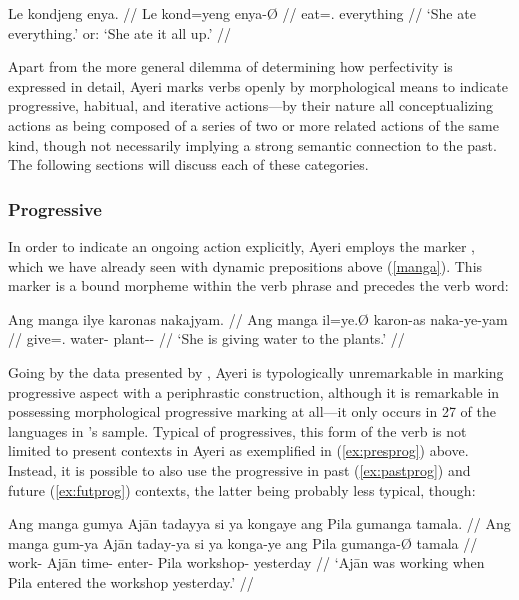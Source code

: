 \ex\begingl
	\gla Le kondjeng enya. //
	\glb Le kond=yeng enya-Ø //
	\glc \PatTI{} eat=\TsgF{}.\Aarg{} everything //
	\glft `She ate everything.' or: `She ate it all up.' //
\endgl\xe

Apart from the more general dilemma of determining how perfectivity is expressed 
in detail, Ayeri marks verbs openly by morphological means to indicate 
progressive, habitual, and iterative actions---by their nature all 
conceptualizing actions as being composed of a series of two or more related 
actions of the same kind, though not necessarily implying a strong semantic 
connection to the past. The following sections will discuss each of these 
categories.

\subsubsection{Progressive}

In order to indicate an ongoing action explicitly, Ayeri employs the marker 
, which we have already seen with dynamic prepositions above 
(\autoref{manga}). This marker is a bound morpheme within the verb phrase and 
precedes the verb word:

\ex\label{ex:presprog}\begingl
	\gla Ang manga ilye karonas nakajyam. //
	\glb Ang manga il=ye.Ø karon-as naka-ye-yam //
	\glc \AgtT{} \Prog{} give=\TsgF{}.\Top{} water-\Parg{} 
		plant-\Pl{}-\Dat{} //
	\glft `She is giving water to the plants.' //
\endgl\xe

Going by the data presented by \citet[91]{dahl1985}, Ayeri is typologically 
unremarkable in marking progressive aspect with a periphrastic construction, 
although it is remarkable in possessing morphological progressive marking at 
all---it only occurs in 27\pct{} of the languages in \citeauthor{dahl1985}'s 
sample. Typical of progressives, this form of the verb is not limited to 
present contexts in Ayeri as exemplified in (\ref{ex:presprog}) above. Instead, 
it is possible to also use the progressive in past (\ref{ex:pastprog}) and 
future (\ref{ex:futprog}) contexts, the latter being probably less typical, 
though:

\pex\label{ex:nonpresprog}
\a\label{ex:pastprog}\begingl
	\gla Ang manga gumya {} Ajān tadayya si ya kongaye ang Pila gumanga 
		tamala. //
	\glb Ang manga gum-ya {} Ajān taday-ya si ya konga-ye ang Pila 
		gumanga-Ø tamala //
	\glc \AgtT{} \Prog{} work-\Tsg{} \Top{} Ajān time-\Loc{} \Rel{} \LocT{} 
		enter-\TsgF{} \Aarg{} Pila workshop-\Top{} yesterday //
	\glft `Ajān was working when Pila entered the workshop yesterday.' //
\endgl

